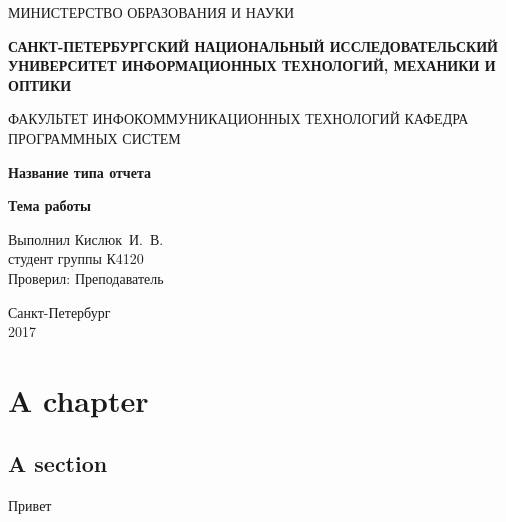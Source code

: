 \documentclass[14pt,a4paper,report]{extreport}
\begin{document}
	\begin{titlepage}
	\begin{center}	
		\fontsize{14pt}{14pt}\selectfont
		МИНИСТЕРСТВО ОБРАЗОВАНИЯ И НАУКИ\\

		\vspace*{0.6\baselineskip}
		
		\textbf{САНКТ-ПЕТЕРБУРГСКИЙ НАЦИОНАЛЬНЫЙ ИССЛЕДОВАТЕЛЬСКИЙ УНИВЕРСИТЕТ ИНФОРМАЦИОННЫХ ТЕХНОЛОГИЙ, МЕХАНИКИ И ОПТИКИ}
		
		\vspace*{0.6\baselineskip}
		ФАКУЛЬТЕТ ИНФОКОММУНИКАЦИОННЫХ ТЕХНОЛОГИЙ
		КАФЕДРА ПРОГРАММНЫХ СИСТЕМ
	
		\vspace*{8\baselineskip}
		\fontsize{19pt}{18pt}\selectfont
		\textbf{Название типа отчета}	
		
		\fontsize{20pt}{18pt}\selectfont
		\textbf{Тема работы}\\
		\vspace*{1.15\baselineskip}
		\end{center}
	
	\vspace*{2\baselineskip}
	\begin{flushright}
	\fontsize{13pt}{10pt}\selectfont
	Выполнил Кислюк~И.~В.\\
	студент группы К4120\\
	Проверил: Преподаватель\\
	\end{flushright}
	
	\vspace*{3\baselineskip}
	\begin{center}
	Санкт-Петербург\\
	2017
	\end{center}
	
	\end{titlepage}

\chapter{A chapter}
\lipsum[1]
\section{A section}
\lipsum[2]
Привет
\end{document}
